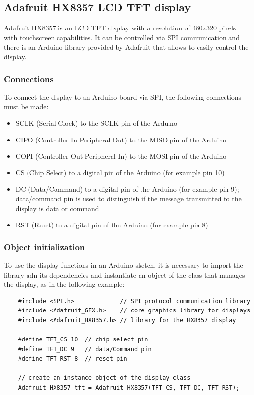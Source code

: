 \newpage

\subsection{Adafruit HX8357 LCD TFT display}
Adafruit HX8357 is an LCD TFT display with a resolution of 480x320 pixels with touchscreen capabilities. It can be controlled
via SPI communication and there is an Arduino library provided by Adafruit that allows to easily control the display.

\subsubsection*{Connections}
To connect the display to an Arduino board via SPI, the following connections must be made:
\begin{itemize}
	\item SCLK (Serial Clock) to the SCLK pin of the Arduino
	\item CIPO (Controller In Peripheral Out) to the MISO pin of the Arduino
	\item COPI (Controller Out Peripheral In) to the MOSI pin of the Arduino
	\item CS (Chip Select) to a digital pin of the Arduino (for example pin 10)
	\item DC (Data/Command) to a digital pin of the Arduino (for example pin 9); data/command pin is used to distinguish
	if the message transmitted to the display is data or command
	\item RST (Reset) to a digital pin of the Arduino (for example pin 8)
\end{itemize}

\subsubsection*{Object initialization}
To use the display functions in an Arduino sketch, it is necessary to import the library adn its dependencies and instantiate
an object of the class that manages the display, as in the following example:
\begin{lstlisting}
	#include <SPI.h>             // SPI protocol communication library
	#include <Adafruit_GFX.h>    // core graphics library for displays
	#include <Adafruit_HX8357.h> // library for the HX8357 display
	
	#define TFT_CS 10  // chip select pin
	#define TFT_DC 9   // data/Command pin
	#define TFT_RST 8  // reset pin
	
	// create an instance object of the display class
	Adafruit_HX8357 tft = Adafruit_HX8357(TFT_CS, TFT_DC, TFT_RST);

\end{lstlisting}


